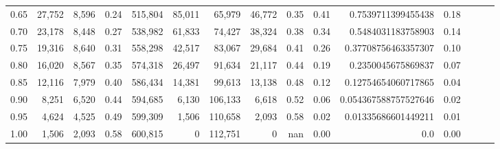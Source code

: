 \begin{tabular}{rrrrrrrrrrrrrrr}
0.65 &  27,752 &  8,596 &  0.24 &  515,804 &   85,011 &   65,979 &   46,772 &  0.35 &  0.41 &    0.7539711399455438 &      0.18 \\
0.70 &  23,178 &  8,448 &  0.27 &  538,982 &   61,833 &   74,427 &   38,324 &  0.38 &  0.34 &    0.5484031183758903 &      0.14 \\
0.75 &  19,316 &  8,640 &  0.31 &  558,298 &   42,517 &   83,067 &   29,684 &  0.41 &  0.26 &   0.37708756463357307 &      0.10 \\
0.80 &  16,020 &  8,567 &  0.35 &  574,318 &   26,497 &   91,634 &   21,117 &  0.44 &  0.19 &    0.2350045675869837 &      0.07 \\
0.85 &  12,116 &  7,979 &  0.40 &  586,434 &   14,381 &   99,613 &   13,138 &  0.48 &  0.12 &   0.12754654060717865 &      0.04 \\
0.90 &   8,251 &  6,520 &  0.44 &  594,685 &    6,130 &  106,133 &    6,618 &  0.52 &  0.06 &  0.054367588757527646 &      0.02 \\
0.95 &   4,624 &  4,525 &  0.49 &  599,309 &    1,506 &  110,658 &    2,093 &  0.58 &  0.02 &   0.01335686601449211 &      0.01 \\
1.00 &   1,506 &  2,093 &  0.58 &  600,815 &        0 &  112,751 &        0 &   nan &  0.00 &                   0.0 &      0.00 \\
\bottomrule
\end{tabular}
